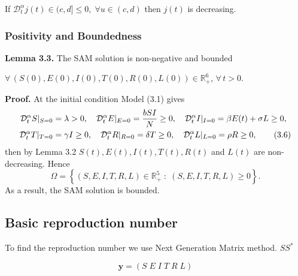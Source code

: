 \documentclass[10pt]{NSP1}
\newcommand{\CD}{\mathcal{D}}
\begin{document}
	If $  \CD_t^\alpha j(t) \in (c,d] \le 0,\; \forall u \in (c,d)$ then $j(t)$ is decreasing.
	
	\subsubsection{\bfseries Positivity and Boundedness}
	
	\noindent\textbf{Lemma 3.3.}
	The SAM solution is non-negative and bounded
	
	$\forall\,(S(0),E(0),I(0),T(0),R(0),L(0)) \in \mathbb{R}_{+}^{6}$,
	$\forall\,t>0$.
	
	
	\textbf{Proof.} At the initial condition Model (3.1) gives
	\begin{align}
		\CD_t^\alpha S|_{S=0} &= \lambda > 0, \quad
		\CD_t^\alpha E|_{E=0} = \frac{b S I}{N} \ge 0, \quad
		\CD_t^\alpha I|_{I=0} = \beta E(t) + \sigma L \ge 0, \notag \\
		\CD_t^\alpha T|_{T=0} &= \gamma I \ge 0, \quad
		\CD_t^\alpha R|_{R=0} = \delta T \ge 0, \quad
		\CD_t^\alpha L|_{L=0} = \rho R \ge 0,
		\tag{3.6}
	\end{align}
	then by Lemma 3.2 $S(t),E(t),I(t),T(t),R(t)$ and $L(t)$ are non-decreasing. Hence
	\begin{equation}
		\Omega = \left\{ (S,E,I,T,R,L) \in \mathbb{R}_{+}^{5} \;:\; (S,E,I,T,R,L) \ge 0 \right\}.
		\tag{3.7}
	\end{equation}
	As a result, the SAM solution is bounded.
	
	\subsection {\centering\bfseries Basic reproduction number}
	
	To find the reproduction number we use Next Generation Matrix method. $SS^*$
	
	\begin{equation}
		\mathbf{y}=(S\;E\;I\;T\;R\;L)
		\tag{3.8}
	\end{equation}
	
\end{document}
